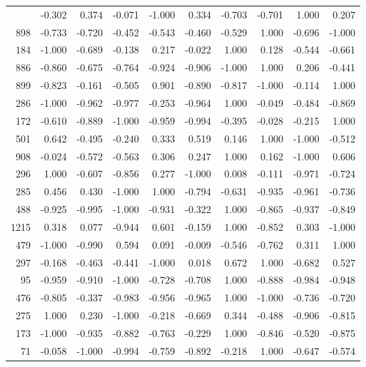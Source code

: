 \begin{longtable}{rrrrrrrrrr}
\bottomrule
\endlastfoot
   491 & -0.302 &  0.374 & -0.071 & -1.000 &  0.334 & -0.703 & -0.701 &  1.000 &  0.207 \\
   898 & -0.733 & -0.720 & -0.452 & -0.543 & -0.460 & -0.529 &  1.000 & -0.696 & -1.000 \\
   184 & -1.000 & -0.689 & -0.138 &  0.217 & -0.022 &  1.000 &  0.128 & -0.544 & -0.661 \\
   886 & -0.860 & -0.675 & -0.764 & -0.924 & -0.906 & -1.000 &  1.000 &  0.206 & -0.441 \\
   899 & -0.823 & -0.161 & -0.505 &  0.901 & -0.890 & -0.817 & -1.000 & -0.114 &  1.000 \\
   286 & -1.000 & -0.962 & -0.977 & -0.253 & -0.964 &  1.000 & -0.049 & -0.484 & -0.869 \\
   172 & -0.610 & -0.889 & -1.000 & -0.959 & -0.994 & -0.395 & -0.028 & -0.215 &  1.000 \\
   501 &  0.642 & -0.495 & -0.240 &  0.333 &  0.519 &  0.146 &  1.000 & -1.000 & -0.512 \\
   908 & -0.024 & -0.572 & -0.563 &  0.306 &  0.247 &  1.000 &  0.162 & -1.000 &  0.606 \\
   296 &  1.000 & -0.607 & -0.856 &  0.277 & -1.000 &  0.008 & -0.111 & -0.971 & -0.724 \\
   285 &  0.456 &  0.430 & -1.000 &  1.000 & -0.794 & -0.631 & -0.935 & -0.961 & -0.736 \\
   488 & -0.925 & -0.995 & -1.000 & -0.931 & -0.322 &  1.000 & -0.865 & -0.937 & -0.849 \\
  1215 &  0.318 &  0.077 & -0.944 &  0.601 & -0.159 &  1.000 & -0.852 &  0.303 & -1.000 \\
   479 & -1.000 & -0.990 &  0.594 &  0.091 & -0.009 & -0.546 & -0.762 &  0.311 &  1.000 \\
   297 & -0.168 & -0.463 & -0.441 & -1.000 &  0.018 &  0.672 &  1.000 & -0.682 &  0.527 \\
    95 & -0.959 & -0.910 & -1.000 & -0.728 & -0.708 &  1.000 & -0.888 & -0.984 & -0.948 \\
   476 & -0.805 & -0.337 & -0.983 & -0.956 & -0.965 &  1.000 & -1.000 & -0.736 & -0.720 \\
   275 &  1.000 &  0.230 & -1.000 & -0.218 & -0.669 &  0.344 & -0.488 & -0.906 & -0.815 \\
   173 & -1.000 & -0.935 & -0.882 & -0.763 & -0.229 &  1.000 & -0.846 & -0.520 & -0.875 \\
    71 & -0.058 & -1.000 & -0.994 & -0.759 & -0.892 & -0.218 &  1.000 & -0.647 & -0.574 \\

\end{longtable}
